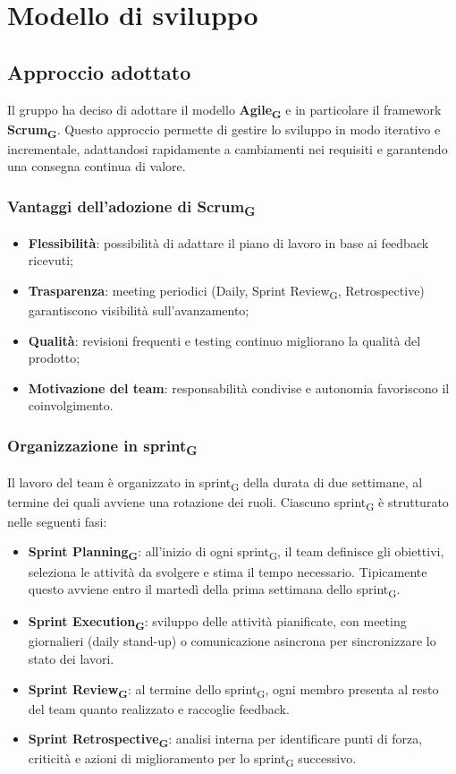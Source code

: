 \documentclass[11pt,a4paper]{article}
\newcommand{\gls}[1]{#1\textsubscript{G}}
\begin{document}
\newpage

\section{Modello di sviluppo}
\subsection{Approccio adottato}
Il gruppo ha deciso di adottare il modello \textbf{\gls{Agile}} e in particolare il framework \textbf{\gls{Scrum}}. Questo approccio permette di gestire lo sviluppo in modo iterativo e incrementale, adattandosi rapidamente a cambiamenti nei requisiti e garantendo una consegna continua di valore.

\subsubsection{Vantaggi dell'adozione di \gls{Scrum}}
\begin{itemize}
    \item \textbf{Flessibilità}: possibilità di adattare il piano di lavoro in base ai feedback ricevuti;
    \item \textbf{Trasparenza}: meeting periodici (Daily, \gls{Sprint Review}, Retrospective) garantiscono visibilità sull’avanzamento;
    \item \textbf{Qualità}: revisioni frequenti e testing continuo migliorano la qualità del prodotto;
    \item \textbf{Motivazione del team}: responsabilità condivise e autonomia favoriscono il coinvolgimento.
\end{itemize}

\subsubsection{Organizzazione in \gls{sprint}}
Il lavoro del team è organizzato in \gls{sprint} della durata di due settimane, al termine dei quali avviene una rotazione dei ruoli. Ciascuno \gls{sprint} è strutturato nelle seguenti fasi:
\begin{itemize}
    \item \textbf{\gls{Sprint Planning}}: all’inizio di ogni \gls{sprint}, il team definisce gli obiettivi, seleziona le attività da svolgere e stima il tempo necessario. Tipicamente questo avviene entro il martedì della prima settimana dello \gls{sprint}.
    \item \textbf{\gls{Sprint Execution}}: sviluppo delle attività pianificate, con meeting giornalieri (daily stand-up) o comunicazione asincrona per sincronizzare lo stato dei lavori.
    \item \textbf{\gls{Sprint Review}}: al termine dello \gls{sprint}, ogni membro presenta al resto del team quanto realizzato e raccoglie feedback.
    \item \textbf{\gls{Sprint Retrospective}}: analisi interna per identificare punti di forza, criticità e azioni di miglioramento per lo \gls{sprint} successivo.
\end{itemize}
\end{document}
